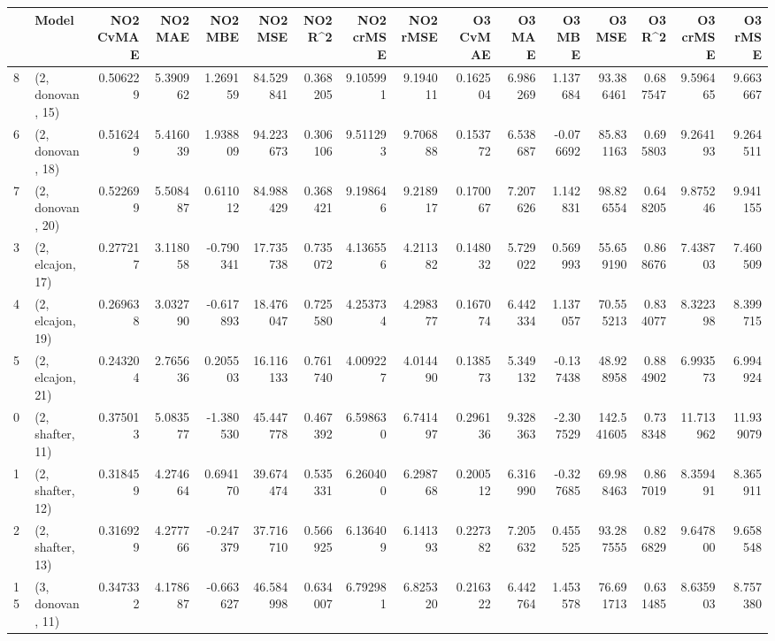 \begin{tabular}{llrrrrrrrrrrrrrr}
\toprule
{} &             Model &  NO2 CvMAE &   NO2 MAE &   NO2 MBE &    NO2 MSE &   NO2 R\textasciicircum2 &  NO2 crMSE &  NO2 rMSE &  O3 CvMAE &    O3 MAE &    O3 MBE &      O3 MSE &    O3 R\textasciicircum2 &   O3 crMSE &    O3 rMSE \\
\midrule
8  &  (2, donovan, 15) &   0.506229 &  5.390962 &  1.269159 &  84.529841 &  0.368205 &   9.105991 &  9.194011 &  0.162504 &  6.986269 &  1.137684 &   93.386461 &  0.687547 &   9.596465 &   9.663667 \\
6  &  (2, donovan, 18) &   0.516249 &  5.416039 &  1.938809 &  94.223673 &  0.306106 &   9.511293 &  9.706888 &  0.153772 &  6.538687 & -0.076692 &   85.831163 &  0.695803 &   9.264193 &   9.264511 \\
7  &  (2, donovan, 20) &   0.522699 &  5.508487 &  0.611012 &  84.988429 &  0.368421 &   9.198646 &  9.218917 &  0.170067 &  7.207626 &  1.142831 &   98.826554 &  0.648205 &   9.875246 &   9.941155 \\
3  &  (2, elcajon, 17) &   0.277217 &  3.118058 & -0.790341 &  17.735738 &  0.735072 &   4.136556 &  4.211382 &  0.148032 &  5.729022 &  0.569993 &   55.659190 &  0.868676 &   7.438703 &   7.460509 \\
4  &  (2, elcajon, 19) &   0.269638 &  3.032790 & -0.617893 &  18.476047 &  0.725580 &   4.253734 &  4.298377 &  0.167074 &  6.442334 &  1.137057 &   70.555213 &  0.834077 &   8.322398 &   8.399715 \\
5  &  (2, elcajon, 21) &   0.243204 &  2.765636 &  0.205503 &  16.116133 &  0.761740 &   4.009227 &  4.014490 &  0.138573 &  5.349132 & -0.137438 &   48.928958 &  0.884902 &   6.993573 &   6.994924 \\
0  &  (2, shafter, 11) &   0.375013 &  5.083577 & -1.380530 &  45.447778 &  0.467392 &   6.598630 &  6.741497 &  0.296136 &  9.328363 & -2.307529 &  142.541605 &  0.738348 &  11.713962 &  11.939079 \\
1  &  (2, shafter, 12) &   0.318459 &  4.274664 &  0.694170 &  39.674474 &  0.535331 &   6.260400 &  6.298768 &  0.200512 &  6.316990 & -0.327685 &   69.988463 &  0.867019 &   8.359491 &   8.365911 \\
2  &  (2, shafter, 13) &   0.316929 &  4.277766 & -0.247379 &  37.716710 &  0.566925 &   6.136409 &  6.141393 &  0.227382 &  7.205632 &  0.455525 &   93.287555 &  0.826829 &   9.647800 &   9.658548 \\
15 &  (3, donovan, 11) &   0.347332 &  4.178687 & -0.663627 &  46.584998 &  0.634007 &   6.792981 &  6.825320 &  0.216322 &  6.442764 &  1.453578 &   76.691713 &  0.631485 &   8.635903 &   8.757380 \\

\end{tabular}
